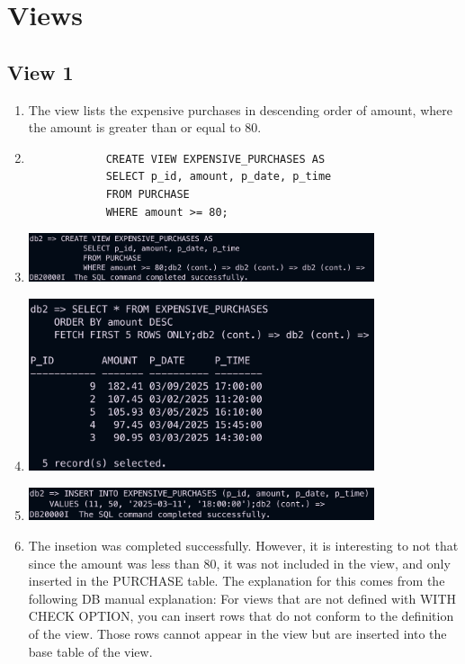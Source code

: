 \documentclass[a4paper,11pt]{article}
\begin{document}
\section{Views}

\subsection*{View 1}

\begin{enumerate}[label=(\alph*)]
    \item The view lists the expensive purchases in descending order of amount, where the amount is greater than or equal to 80. 
    \item 
        \begin{lstlisting}
            CREATE VIEW EXPENSIVE_PURCHASES AS
            SELECT p_id, amount, p_date, p_time
            FROM PURCHASE
            WHERE amount >= 80;
        \end{lstlisting}
    \item 
        \includegraphics[width=0.8\textwidth]{View1.png}
    \item 
        \includegraphics[width=0.8\textwidth]{View1_d.png}
    \item 
        \includegraphics[width=0.8\textwidth]{View1_e.png}
    \item The insetion was completed successfully. However, it is interesting to not that since the amount 
    was less than 80, it was not included in the view, and only inserted in the PURCHASE table. 
    The explanation for this comes from the following DB manual explanation: For views that are not defined with WITH CHECK OPTION, you can insert rows that do not conform to the definition of the view. Those rows cannot appear in the view but are inserted into the base table of the view.
\end{enumerate}
\end{document}
